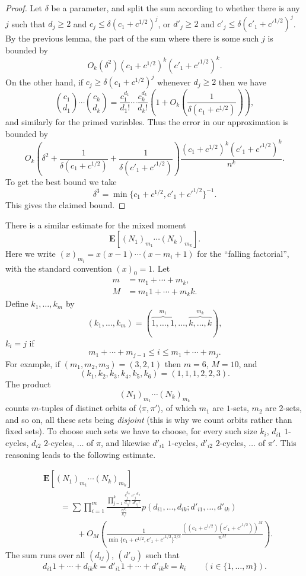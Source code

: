 \documentclass[ALCO,ThmDefs,Unicode,epreuves]{cedram}
\newcommand\E{\mathbf{E}}
\newcommand\br[1]{\left({#1}\right)}
\newcommand\pfrac[2]{\br{\frac{#1}{#2}}}
\begin{document}
\begin{proof}
Let $\delta$ be a parameter, and split the sum according to whether there is any $j$ such that $d_j \geq 2$ and $c_j \leq \delta (c_1 + c^{1/2})^j$, or $d'_j\geq 2$ and $c'_j \leq \delta (c'_1 + {c'}^{1/2})^j$. By the previous lemma, the part of the sum where there is some such $j$ is bounded by
\[
 O_k(\delta^2) (c_1 + c^{1/2})^k (c'_1 + {c'}^{1/2})^k.
\]
On the other hand, if $c_j \geq \delta (c_1 + c^{1/2})^j$ whenever $d_j \geq 2$ then we have
\[
 \binom{c_1}{d_1} \cdots \binom{c_k}{d_k}
 = \frac{c_1^{d_1}}{d_1!} \cdots \frac{c_k^{d_k}}{d_k!} \left(1 + O_k\pfrac{1}{\delta (c_1 + c^{1/2})} \right),
\]
and similarly for the primed variables. Thus the error in our approximation is bounded by
\[
 O_k\left(\delta^2 + \frac1{\delta (c_1 + c^{1/2})} + \frac1{\delta (c'_1 + {c'}^{1/2})} \right)
 \frac{(c_1 + c^{1/2})^k (c'_1 + {c'}^{1/2})^k}{n^k}.
\]
To get the best bound we take
\[
 \delta^3 = \min\{c_1 + c^{1/2}, c'_1 + {c'}^{1/2}\}^{-1}.
\]
This gives the claimed bound.
\end{proof}

There is a similar estimate for the mixed moment
\[
 \E[(N_1)_{m_1} \cdots (N_k)_{m_k}].
\]
Here we write $(x)_{m_i} = x(x-1) \cdots (x-m_i+1)$ for the ``falling factorial'', with the standard convention $(x)_0=1$. Let
\begin{align*}
 m &= m_1 + \cdots + m_k, \\
 M &= m_1 1 + \cdots + m_k k.
\end{align*}
Define $k_1, \dots, k_m$ by
\[
 (k_1, \dots, k_m) = (
 \overbrace{1, \dots, 1}^{m_1},
 \dots,
 \overbrace{k, \dots, k}^{m_k}
 ),
\]
\ie $k_i = j$ if
\[
 m_1 + \cdots + m_{j-1} \leq i \leq m_1 + \cdots + m_j.
\]
For example, if $(m_1, m_2, m_3) = (3, 2, 1)$ then $m = 6$, $M = 10$, and
\[
 (k_1, k_2, k_3, k_4, k_5, k_6)
 = (1, 1, 1, 2, 2, 3).
\]
The product
\[
 (N_1)_{m_1} \cdots (N_k)_{m_k}
\]
counts $m$-tuples of distinct orbits of $\langle \pi, \pi'\rangle$, of which $m_1$ are $1$-sets, $m_2$ are $2$-sets, and so on, all these sets being \emph{disjoint} (this is why we count orbits rather than fixed sets). To choose such sets we have to choose, for every such size $k_i$, $d_{i1}$ $1$-cycles, $d_{i2}$ $2$-cycles, $\dots$ of $\pi$, and likewise $d'_{i1}$ $1$-cycles, $d'_{i2}$ $2$-cycles, $\dots$ of $\pi'$. This reasoning leads to the following estimate.

\begin{lemma}
\begin{align*}
 &\E[(N_1)_{m_1} \cdots (N_k)_{m_k}] \\
 &\qquad = \sum \prod_{i=1}^m \frac{\prod_{j=1}^{k} \frac{c_j^{d_{ij}}}{d_{ij}!}\frac{{c'_j}^{d'_{ij}}}{d'_{ij}!}}{\frac{n^{k_i}}{k_i!}} p(d_{i1}, \dots, d_{ik} ; d'_{i1}, \dots, d'_{ik}) \\
 &\qquad\qquad + O_M\left(
 \frac1{\min\{c_1 + c^{1/2}, c'_1 + {c'}^{1/2}\}^{2/3}}
 \frac{((c_1 + c^{1/2})(c'_1 + {c'}^{1/2}))^M}{n^M}
 \right).
\end{align*}
The sum runs over all $(d_{ij})$, $(d'_{ij})$ such that
\[
 d_{i1} 1 + \cdots + d_{ik} k =
 d'_{i1} 1 + \cdots + d'_{ik} k = k_i \qquad (i \in \{1, \dots, m\}).
\]
\end{lemma}
\end{document}
